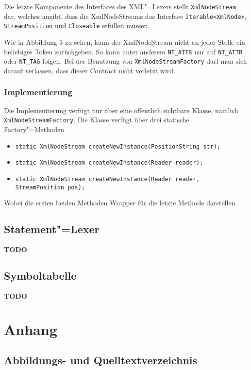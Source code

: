 \documentclass[10pt,a4paper,ngerman,titlepage,tocindentauto]{scrartcl}
\newcommand{\TODO}{ {\LARGE\bf\color{crimson} TODO} }
\newcommand{\n}{\linebreak[1]}
\begin{document}
				Die letzte Komponente des Interfaces des XML"=Lexers stellt \texttt{XmlNodeStream} dar, welches
				angibt, dass die XmlNodeStreams das Interface \texttt{Iterable<{\n}XmlNode>}, \texttt{StreamPosition} und
				\texttt{Closeable} erfüllen müssen.
				
				Wie in Abbildung 3 zu sehen, kann der XmlNodeStream nicht an jeder Stelle ein beliebiges Token zurückgeben.
				So kann unter anderem \texttt{NT\_ATTR} nur auf \texttt{NT\_ATTR} oder \texttt{NT\_TAG} folgen.
				Bei der Benutzung von \texttt{XmlNodeStreamFactory} darf man sich darauf verlassen, dass dieser Contract
				nicht verletzt wird.
			
			\subsubsection*{Implementierung}
				Die Implementierung verfügt nur über eine öffentlich sichtbare Klasse, nämlich \texttt{XmlNodeStreamFactory}.
				Die Klasse verfügt über drei statische Factory"=Methoden
				\begin{itemize}
					\item \texttt{static XmlNodeStream createNewInstance(PositionString str);}
					\item \texttt{static XmlNodeStream createNewInstance(Reader reader);}
					\item \texttt{static XmlNodeStream createNewInstance(Reader reader, StreamPosition pos);}
				\end{itemize}
				Wobei die ersten beiden Methoden Wrapper für die letzte Methode darstellen.
	
		\subsection{Statement"=Lexer}
			\TODO
	
		\subsection{Symboltabelle}
			\TODO
	
	\section{Anhang}
		\subsection{Abbildungs- und Quelltextverzeichnis}
			\listoffigures
			\lstlistoflistings
		
\end{document}
